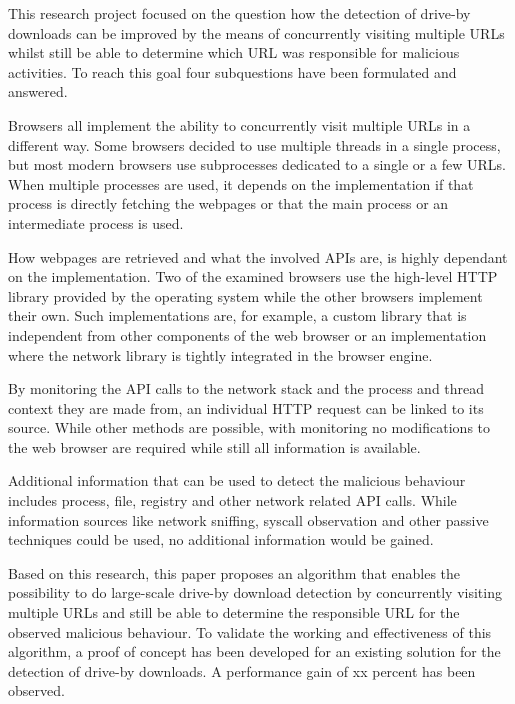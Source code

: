 This research project focused on the question how the detection of drive-by downloads can be improved by the means of concurrently visiting multiple URLs whilst still be able to determine which URL was responsible for malicious activities. To reach this goal four subquestions have been formulated and answered.

Browsers all implement the ability to concurrently visit multiple URLs in a different way. Some browsers decided to use multiple threads in a single process, but most modern browsers use subprocesses dedicated to a single or a few URLs. When multiple processes are used, it depends on the implementation if that process is directly fetching the webpages or that the main process or an intermediate process is used.

How webpages are retrieved and what the involved APIs are, is highly dependant on the implementation. Two of the examined browsers use the high-level HTTP library provided by the operating system while the other browsers implement their own. Such implementations are, for example, a custom library that is independent from other components of the web browser or an implementation where the network library is tightly integrated in the browser engine.

By monitoring the API calls to the network stack and the process and thread context they are made from, an individual HTTP request can be linked to its source. While other methods are possible, with monitoring no modifications to the web browser are required while still all information is available.

Additional information that can be used to detect the malicious behaviour includes process, file, registry and other network related API calls. While information sources like network sniffing, syscall observation and other passive techniques could be used, no additional information would be gained.

Based on this research, this paper proposes an algorithm that enables the possibility to do large-scale drive-by download detection by concurrently visiting multiple URLs and still be able to determine the responsible URL for the observed malicious behaviour. To validate the working and effectiveness of this algorithm, a proof of concept has been developed for an existing solution for the detection of drive-by downloads. A performance gain of xx\todo{} percent has been observed.
